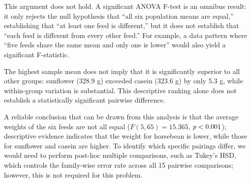 This argument does not hold. A significant ANOVA F-test is an omnibus result: it only rejects the null hypothesis that ``all six population means are equal,'' establishing that ``at least one feed is different,'' but it does not establish that ``each feed is different from every other feed.'' For example, a data pattern where ``five feeds share the same mean and only one is lower'' would also yield a significant F-statistic.

The highest sample mean does not imply that it is significantly superior to all other groups: sunflower (328.9 g) exceeded casein (323.6 g) by only 5.3 g, while within-group variation is substantial. This descriptive ranking alone does not establish a statistically significant pairwise difference.

A reliable conclusion that can be drawn from this analysis is that the average weights of the six feeds are not all equal ($F(5, 65) = 15.365$, $\mathit{p} < 0.001$); descriptive evidence indicates that the weight for horsebean is lower, while those for sunflower and casein are higher. To identify which specific pairings differ, we would need to perform post-hoc multiple comparisons, such as Tukey's HSD, which controls the family-wise error rate across all 15 pairwise comparisons; however, this is not required for this problem.

